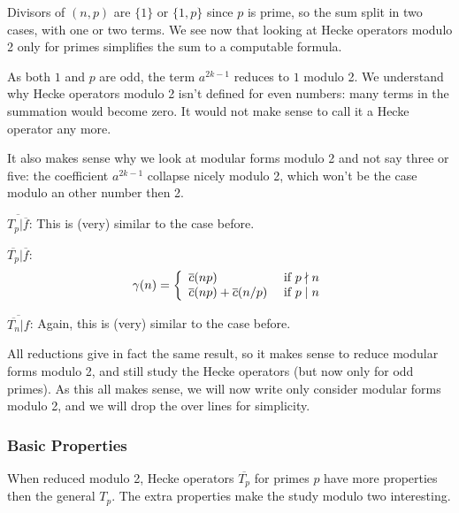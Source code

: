 Divisors of $(n,p)$ are $\{1\}$ or $\{1,p\}$ since $p$ is prime, so the sum split in two cases, with one or two terms.
We see now that looking at Hecke operators modulo 2 only for primes simplifies the sum to a computable formula.

As both $1$ and $p$ are odd, the term $a^{2k-1}$ reduces to $1$ modulo 2.
We understand why Hecke operators modulo 2 isn't defined for even numbers: many terms in the summation would become zero.
It would not make sense to call it a Hecke operator any more.

It also makes sense why we look at modular forms modulo 2 and not say three or five: the coefficient $a^{2k-1}$ collapse nicely modulo 2, which won't be the case modulo an other number then 2.

$\overline{T_p|\overline{f}}$:
This is (very) similar to the case before.

$\overline{T_p}|\overline{f}$:
$$
\gamma(n)
= \left\lbrace
\begin{array}{l l}
  \overline{c}(np)                   & \text{ if } p \nmid n \\
  \overline{c}(np)+\overline{c}(n/p) & \text{ if } p \mid  n
\end{array}
\right.
$$

$\overline{\overline{T_n}|f}$:
Again, this is (very) similar to the case before.

All reductions give in fact the same result, so it makes sense to reduce modular forms modulo 2, and still study the Hecke operators (but now only for odd primes).
As this all makes sense, we will now write only consider modular forms modulo 2, and we will drop the over lines for simplicity.

\subsubsection{Basic Properties}
When reduced modulo 2, Hecke operators $\overline{T_p}$ for primes $p$ have more properties then the general $T_p$.
The extra properties make the study modulo two interesting.

